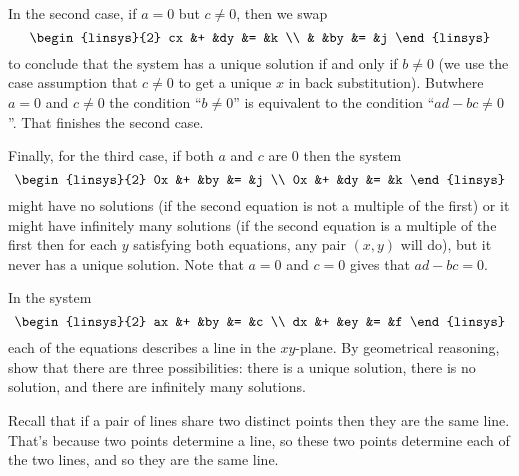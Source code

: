\begin{exercises}
\begin{answer}
      In the second case, if \( a=0 \) but \( c\neq 0 \), then we swap
      \begin{equation*}
        \begin{linsys}{2}
          cx  &+  &dy  &=  &k  \\
              &   &by  &=  &j  
        \end{linsys}
      \end{equation*}
      to conclude that the system has a unique solution if and only if 
      \( b\neq 0 \)
      (we use the case assumption that \( c\neq 0 \) to get a unique
      \( x \) in back substitution).
      But\Dash where \( a=0 \) and \( c\neq 0 \)\Dash
      the condition ``\( b\neq 0 \)''
      is equivalent to the condition ``\( ad-bc\neq 0 \)''.
      That finishes the second case.

      Finally, for the third case,
      if both \( a \) and \( c \) are \( 0 \) then the system
      \begin{equation*}
        \begin{linsys}{2}
          0x  &+  &by  &=  &j  \\
          0x  &+  &dy  &=  &k  
        \end{linsys}
      \end{equation*}
      might have no solutions (if the second equation is not a multiple of the
      first) or it might have infinitely many solutions (if the second
      equation is a multiple of the first then for each \( y \) satisfying
      both equations, any pair \( (x,y) \) will do), but it never has a unique
      solution.
      Note that \( a=0 \) and \( c=0 \) gives that \( ad-bc=0 \).  
    \end{answer}
  \recommended \item 
    In the system
    \begin{equation*}
      \begin{linsys}{2}
         ax  &+  &by  &=  &c  \\
         dx  &+  &ey  &=  &f  
      \end{linsys}
    \end{equation*}
    each of the equations describes a line in the \( xy \)-plane.
    By geometrical reasoning, show that there are three possibilities:
    there is a unique solution, there is no solution, 
    and there are infinitely many solutions.
    \begin{answer}
      Recall that if a pair of lines share two distinct points then
      they are the same line. 
      That's because two points determine a line, so these
      two points determine each of the two lines, 
      and so they are the same line.


\end{answer}
\end{exercises}
